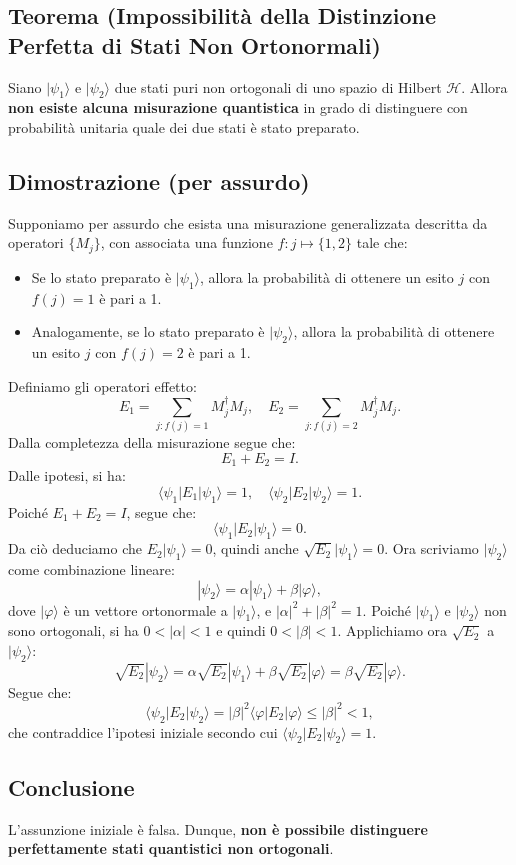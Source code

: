 \documentclass[a4paper,12pt]{report}
\theoremstyle{plain}
\begin{document}
\subsection*{Teorema (Impossibilità della Distinzione Perfetta di Stati Non Ortonormali)}
Siano $|\psi_1\rangle$ e $|\psi_2\rangle$ due stati puri non ortogonali di uno spazio di Hilbert $\mathcal{H}$. Allora \textbf{non esiste alcuna misurazione quantistica} in grado di distinguere con probabilità unitaria quale dei due stati è stato preparato.
\subsection*{Dimostrazione (per assurdo)}
Supponiamo per assurdo che esista una misurazione generalizzata descritta da operatori $\{M_j\}$, con associata una funzione $f : j \mapsto \{1,2\}$ tale che:
\begin{itemize}
    \item Se lo stato preparato è $|\psi_1\rangle$, allora la probabilità di ottenere un esito $j$ con $f(j) = 1$ è pari a 1.
    \item Analogamente, se lo stato preparato è $|\psi_2\rangle$, allora la probabilità di ottenere un esito $j$ con $f(j) = 2$ è pari a 1.
\end{itemize}
Definiamo gli operatori effetto:
$$
E_1 = \sum_{j : f(j) = 1} M_j^\dagger M_j, \quad E_2 = \sum_{j : f(j) = 2} M_j^\dagger M_j.
$$
Dalla completezza della misurazione segue che:
$$
E_1 + E_2 = I.
$$
Dalle ipotesi, si ha:
$$
\langle\psi_1|E_1|\psi_1\rangle = 1, \quad \langle\psi_2|E_2|\psi_2\rangle = 1.
$$
Poiché $E_1 + E_2 = I$, segue che:
$$
\langle\psi_1|E_2|\psi_1\rangle = 0.
$$
Da ciò deduciamo che $E_2|\psi_1\rangle = 0$, quindi anche $\sqrt{E_2}|\psi_1\rangle = 0$.
Ora scriviamo $|\psi_2\rangle$ come combinazione lineare:
$$
|\psi_2\rangle = \alpha|\psi_1\rangle + \beta|\varphi\rangle,
$$
dove $|\varphi\rangle$ è un vettore ortonormale a $|\psi_1\rangle$, e $|\alpha|^2 + |\beta|^2 = 1$. Poiché $|\psi_1\rangle$ e $|\psi_2\rangle$ non sono ortogonali, si ha $0 < |\alpha| < 1$ e quindi $0 < |\beta| < 1$.
Applichiamo ora $\sqrt{E_2}$ a $|\psi_2\rangle$:
$$
\sqrt{E_2}|\psi_2\rangle = \alpha\sqrt{E_2}|\psi_1\rangle + \beta\sqrt{E_2}|\varphi\rangle = \beta\sqrt{E_2}|\varphi\rangle.
$$
Segue che:
$$
\langle\psi_2|E_2|\psi_2\rangle = |\beta|^2\langle\varphi|E_2|\varphi\rangle \le |\beta|^2 < 1,
$$
che contraddice l'ipotesi iniziale secondo cui $\langle\psi_2|E_2|\psi_2\rangle = 1$.
\subsection*{Conclusione}
L'assunzione iniziale è falsa. Dunque, \textbf{non è possibile distinguere perfettamente stati quantistici non ortogonali}.
\end{document}
